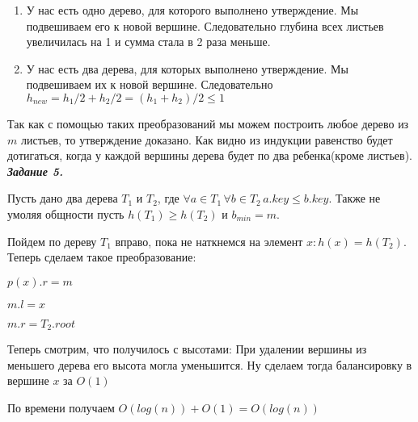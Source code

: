 \documentclass[12pt, a4paper]{scrartcl}
\begin{document}
\begin{enumerate}
	\item У нас есть одно дерево, для которого выполнено утверждение. Мы подвешиваем его к новой вершине. Следовательно глубина всех листьев увеличилась на 1 и сумма стала в 2 раза меньше.
	\item У нас есть два дерева, для которых выполнено утверждение. Мы подвешиваем их к новой вершине. Следовательно $h_{new}=h_1/2+h_2/2=(h_1+h_2)/2\le1$
\end{enumerate}

Так как с помощью таких преобразований мы можем построить любое дерево из $m$ листьев, то утверждение доказано.
Как видно из индукции равенство будет дотигаться, когда у каждой вершины дерева будет по два ребенка(кроме листьев).
\newpage
\emph{\textbf{Задание 5.}}\par

Пусть дано два дерева $T_1$ и $T_2$, где $\forall a \in T_1 \, \forall b \in T_2 \, a.key \le b.key$.
Также не умоляя общности пусть $h(T_1)\ge h(T_2)$ и $b_{min}=m$.

Пойдем по дереву $T_1$ вправо, пока не наткнемся на элемент $x: h(x)=h(T_2)$.
Теперь сделаем такое преобразование:\par
$p(x).r=m$\par
$m.l=x$\par
$m.r = T_2.root$\par

Теперь смотрим, что получилось с высотами: При удалении вершины из меньшего дерева его высота могла уменьшится. Ну сделаем тогда балансировку в вершине $x$ за $O(1)$

По времени получаем $O(log(n))+O(1)=O(log(n))$

\end{document}
